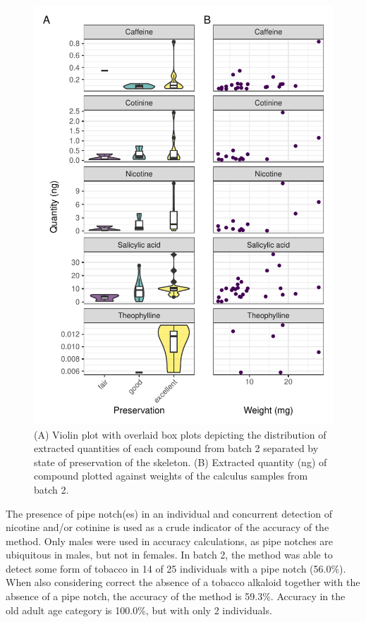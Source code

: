 \documentclass[
]{article}
\begin{document}
\begin{figure}

{\centering \includegraphics{paper_files/figure-pdf/fig-detection-preservation-1.pdf}

}

\caption{\label{fig-detection-preservation}(A) Violin plot with overlaid
box plots depicting the distribution of extracted quantities of each
compound from batch 2 separated by state of preservation of the
skeleton. (B) Extracted quantity (ng) of compound plotted against
weights of the calculus samples from batch 2.}

\end{figure}

The presence of pipe notch(es) in an individual and concurrent detection
of nicotine and/or cotinine is used as a crude indicator of the accuracy
of the method. Only males were used in accuracy calculations, as pipe
notches are ubiquitous in males, but not in females. In batch 2, the
method was able to detect some form of tobacco in 14 of 25 individuals
with a pipe notch (56.0\%). When also considering correct the absence of
a tobacco alkaloid together with the absence of a pipe notch, the
accuracy of the method is 59.3\%. Accuracy in the old adult age category
is 100.0\%, but with only 2 individuals.
\end{document}
